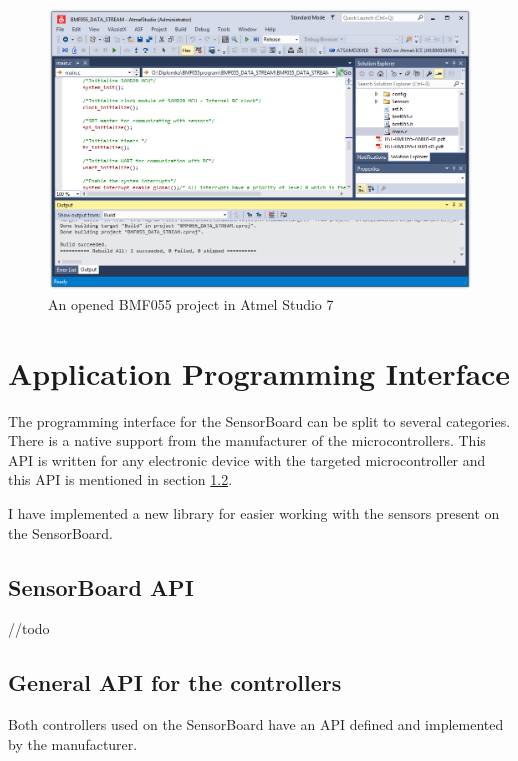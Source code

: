\begin{figure}
	\centering
	\label{BMF055AtmelStudio}
	\caption{An opened BMF055 project in Atmel Studio 7}
	\includegraphics[width=16cm]{img/BMF055AtmelStudio.png}
\end{figure}

\section{Application Programming Interface}
The programming interface for the SensorBoard can be split to several categories. There is a native support from the manufacturer of the microcontrollers. This API is written for any electronic device with the targeted microcontroller and this API is mentioned in section \ref{GeneralAPI}.

I have implemented a new library for easier working with the sensors present on the SensorBoard.

\subsection{SensorBoard API}
//todo

\subsection{General API for the controllers}
\label{GeneralAPI}
Both controllers used on the SensorBoard have an API defined and implemented by the manufacturer.

